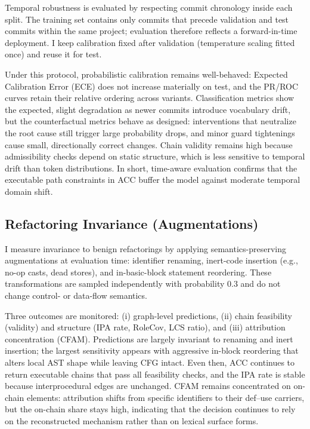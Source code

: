 \documentclass{buthesis}
\begin{document}
Temporal robustness is evaluated by respecting commit chronology inside each split. The training set contains only commits that precede validation and test commits within the same project; evaluation therefore reflects a forward-in-time deployment. I keep calibration fixed after validation (temperature scaling fitted once) and reuse it for test.

Under this protocol, probabilistic calibration remains well-behaved: Expected Calibration Error (ECE) does not increase materially on test, and the PR/ROC curves retain their relative ordering across variants. Classification metrics show the expected, slight degradation as newer commits introduce vocabulary drift, but the counterfactual metrics behave as designed: interventions that neutralize the root cause still trigger large probability drops, and minor guard tightenings cause small, directionally correct changes. Chain validity remains high because admissibility checks depend on static structure, which is less sensitive to temporal drift than token distributions. In short, time-aware evaluation confirms that the executable path constraints in ACC buffer the model against moderate temporal domain shift.

\subsection{Refactoring Invariance (Augmentations)}
\label{subsec:robust-refactor}

I measure invariance to benign refactorings by applying semantics-preserving augmentations at evaluation time: identifier renaming, inert-code insertion (e.g., no-op casts, dead stores), and in-basic-block statement reordering. These transformations are sampled independently with probability $0.3$ and do not change control- or data-flow semantics.

Three outcomes are monitored: (i) graph-level predictions, (ii) chain feasibility (validity) and structure (IPA rate, RoleCov, LCS ratio), and (iii) attribution concentration (CFAM). Predictions are largely invariant to renaming and inert insertion; the largest sensitivity appears with aggressive in-block reordering that alters local AST shape while leaving CFG intact. Even then, ACC continues to return executable chains that pass all feasibility checks, and the IPA rate is stable because interprocedural edges are unchanged. CFAM remains concentrated on on-chain elements: attribution shifts from specific identifiers to their def–use carriers, but the on-chain share stays high, indicating that the decision continues to rely on the reconstructed mechanism rather than on lexical surface forms. 
\end{document}
